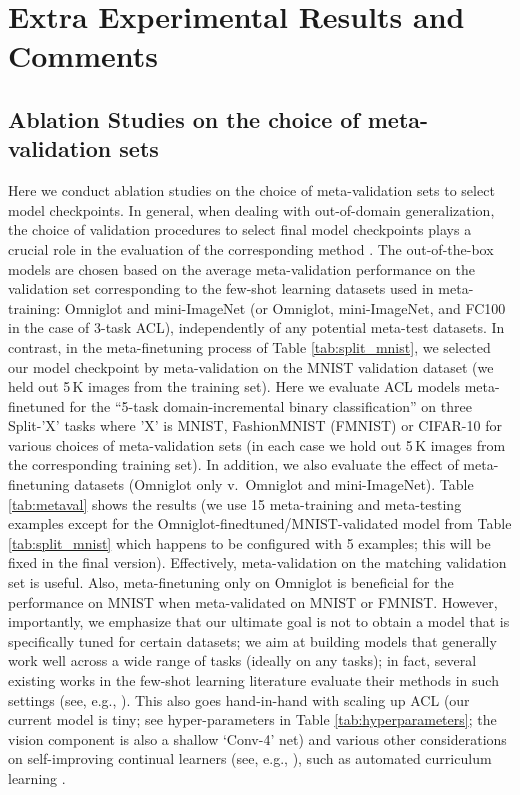 \documentclass{article}
\begin{document}
\section{Extra Experimental Results and Comments}

\subsection{Ablation Studies on the choice of meta-validation sets}
\label{app:meta-val}
Here we conduct ablation studies on the choice of meta-validation sets to select model checkpoints.
In general, when dealing with out-of-domain generalization, the choice of validation procedures to select final model checkpoints plays a crucial role in the evaluation of the corresponding method \citep{csordas2021devil,irie2021improving}.
The out-of-the-box models are chosen based on the average meta-validation performance on the validation set corresponding to the few-shot learning datasets used in meta-training: Omniglot and mini-ImageNet (or Omniglot, mini-ImageNet, and FC100 in the case of 3-task ACL), independently of any potential meta-test datasets.
In contrast, in the meta-finetuning process of Table \ref{tab:split_mnist}, we selected our model checkpoint by meta-validation on the MNIST validation dataset (we held out 5\,K images from the training set).
Here we evaluate ACL models meta-finetuned for the ``5-task domain-incremental binary classification'' on three Split-'X' tasks where 'X' is MNIST, FashionMNIST (FMNIST) or CIFAR-10 for various choices of meta-validation sets (in each case we hold out 5\,K images from the corresponding training set).
In addition, we also evaluate the effect of meta-finetuning datasets (Omniglot only v.~Omniglot and mini-ImageNet).
Table \ref{tab:metaval} shows the results (we use 15 meta-training and meta-testing examples except for the Omniglot-finedtuned/MNIST-validated model from Table \ref{tab:split_mnist} which happens to be configured with 5 examples; this will be fixed in the final version).
Effectively, meta-validation on the matching validation set is useful.
Also, meta-finetuning only on Omniglot is beneficial for the performance on MNIST when meta-validated on MNIST or FMNIST.
However, importantly, we emphasize that our ultimate goal is not to obtain a model that is specifically tuned for certain datasets; we aim at building models that generally work well across a wide range of tasks (ideally on any tasks); in fact, several existing works in the few-shot learning literature evaluate their methods in such settings (see, e.g., \citet{Requeima0BNT19,Bronskill0RNT20,TriantafillouZD20}).
This also goes hand-in-hand with scaling up ACL (our current model is tiny; see hyper-parameters in Table \ref{tab:hyperparameters}; the vision component is also a shallow `Conv-4' net) and various other considerations on self-improving continual learners (see, e.g., \citet{schmidhuber2018one}), such as automated curriculum learning \citep{GravesBMMK17}.
\end{document}
